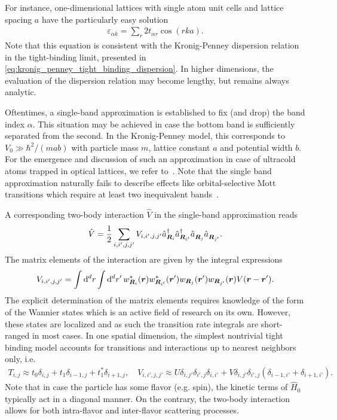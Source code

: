 For instance, one-dimensional lattices with single atom unit cells and lattice spacing $a$ have the particularly easy solution
\begin{align}
    \varepsilon_{\alpha k} = \sum_r 2t_{\alpha r}\cos(r ka).
    \label{eq:1D_tight_binding_dispersion}
\end{align}
Note that this equation is consistent with the Kronig-Penney dispersion relation in the tight-binding limit, presented in \cref{eq:kronig_penney_tight_binding_dispersion}.
In higher dimensions, the evaluation of the dispersion relation may become lengthy, but remains always analytic.

Oftentimes, a single-band approximation is established to fix (and drop) the band index $\alpha$.
This situation may be achieved in case the bottom band is sufficiently separated from the second.
In the Kronig-Penney model, this corresponds to $V_0\gg \hbar^2/(mab)$ with particle mass $m$, lattice constant $a$ and potential width $b$.
For the emergence and discussion of such an approximation in case of ultracold atoms trapped in optical lattices, we refer to~\cite{Jaksch1998,Bloch2008,Buechler2010,Mazza2012}.
Note that the single band approximation naturally fails to describe effects like orbital-selective Mott transitions which require at least two inequivalent bands~\cite{Anisimov2002,vanDongen2005}.

A corresponding two-body interaction $\hat V$ in the single-band approximation reads
\begin{align}
    \hat V = \frac12\sum_{i,i',j,j'}V_{i,i',j,j'}\hat a^\dag_{{\bm R}_i}\hat a^\dag_{{\bm R}_{i'}}\hat a^\pdag_{{\bm R}_j}\hat a^\pdag_{{\bm R}_{j'}}.
\end{align}
The matrix elements of the interaction are given by the integral expressions
\begin{align}
    V_{i,i',j,j'} = \int\mathrm d^dr\int\mathrm d^dr'\,w^*_{{\bm R}_i}({\bm r})w^*_{{\bm R}_{i'}}({\bm r}')w_{{\bm R}_j}({\bm r}')w_{{\bm R}_{j'}}({\bm r})V({\bm r-\bm r'}).
    \label{eq:two_body_interaction_transition_rates}
\end{align}
The explicit determination of the matrix elements requires knowledge of the form of the Wannier states which is an active field of research on its own.
However, these states are localized and as such the transition rate integrals are short-ranged in most cases.
In one spatial dimension, the simplest nontrivial tight binding model accounts for transitions and interactions up to nearest neighbors only, i.e.
\begin{align}
    T_{i,j} \approx t_0\delta_{i,j} + t_1\delta_{i-1,j}+t_1^*\delta_{i+1,j},
    \quad
    V_{i,i',j,j'} \approx U\delta_{i,j'}\delta_{i',j}\delta_{i,i'} + V\delta_{i,j'}\delta_{i',j}(\delta_{i-1,i'}+\delta_{i+1,i'}).
\end{align}
Note that in case the particle has some flavor (e.g. spin), the kinetic terms of $\hat H_0$ typically act in a diagonal manner.
On the contrary, the two-body interaction allows for both intra-flavor and inter-flavor scattering processes.

